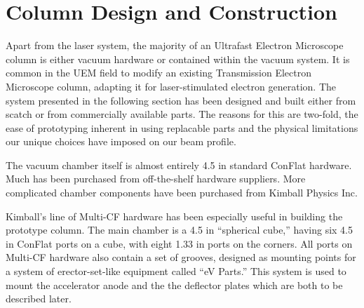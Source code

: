\section{Column Design and Construction}

Apart from the laser system, the majority of an Ultrafast Electron Microscope column is either vacuum hardware or contained within the vacuum system.
It is common in the UEM field to modify an existing Transmission Electron Microscope column, adapting it for laser-stimulated electron generation.
The system presented in the following section has been designed and built either from scatch or from commercially available parts.
The reasons for this are two-fold, the ease of prototyping inherent in using replacable parts and the physical limitations our unique choices have imposed on our beam profile.

The vacuum chamber itself is almost entirely 4.5 in standard ConFlat hardware.
Much has been purchased from off-the-shelf hardware suppliers.
More complicated chamber components have been purchased from Kimball Physics Inc.

Kimball's line of Multi-CF hardware has been especially useful in building the prototype column.
The main chamber is a 4.5 in ``spherical cube,'' having six 4.5 in ConFlat ports on a cube, with eight 1.33 in ports on the corners.
All ports on Multi-CF hardware also contain a set of grooves, designed as mounting points for a system of erector-set-like equipment called ``eV Parts.''
This system is used to mount the accelerator anode and the the deflector plates which are both to be described later.

